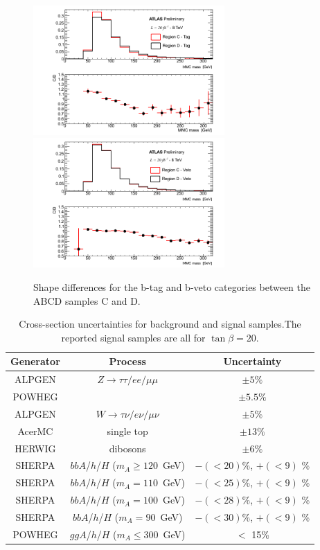 \begin{figure}[tp]
	\begin{center}
	\includegraphics[width=0.65\textwidth]{figure/QCD/shape_tag.png}
	\includegraphics[width=0.65\textwidth]{figure/QCD/shape_veto.png}
	\end{center}
	\caption{Shape differences for the b-tag and b-veto categories between the ABCD samples C and D.}
	\label{fig:qcd_shape_unc}
\end{figure}






\begin{table} [t]
\centering
\begin{tabular}{c c c }
\hline
\hline
Generator & Process & Uncertainty \\ [0.5ex]
\hline
ALPGEN & $Z \rightarrow \tau\tau / ee /\mu\mu$ & $\pm 5\%$ \\
POWHEG & \ttbar					& $\pm 5.5\%$\\
ALPGEN & $W  \rightarrow \tau\nu / e\nu /\mu\nu$&  $\pm  5\%$ \\
AcerMC & single top & $\pm 13 \%$ \\
HERWIG & dibosons & $\pm 6 \%$ \\
SHERPA & $bbA$/$h$/$H$  ($m_{A} \ge 120$~GeV)     & $-(<20)$\%,  $+(<9)$ \%\\
SHERPA & $bbA$/$h$/$H$  ($m_{A} =   110$~GeV)     & $-(<25)$\%,  $+(<9)$ \%\\
SHERPA & $bbA$/$h$/$H$  ($m_{A} =   100$~GeV)     & $-(<28)$\%,  $+(<9)$ \%\\
SHERPA & $bbA$/$h$/$H$  ($m_{A} =    90$~GeV)     & $-(<30)$\%,  $+(<9)$ \%\\
POWHEG & $ggA$/$h$/$H$  ($m_{A} \le 300$~GeV)     & $<$ 15\%\\  [0.5ex]
\hline \hline 
\end{tabular}
\caption{Cross-section uncertainties for background and signal samples.The reported signal samples are all for $\tan\beta = 20$.}
\label{table:sys_xsec}
\end{table}



